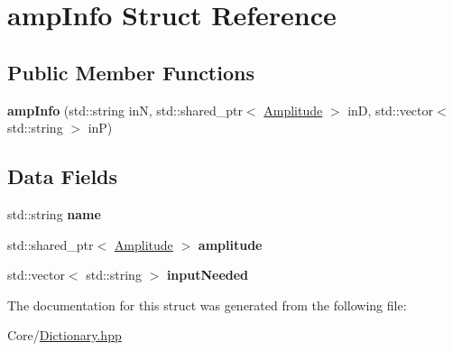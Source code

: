 \hypertarget{structamp_info}{\section{amp\-Info Struct Reference}
\label{structamp_info}
}
\subsection*{Public Member Functions}
\begin{DoxyCompactItemize}
\item 
\hypertarget{structamp_info_adf51b3bea0df687ae0efa95acf047aae}{{\bfseries amp\-Info} (std\-::string in\-N, std\-::shared\-\_\-ptr$<$ \hyperlink{class_amplitude}{Amplitude} $>$ in\-D, std\-::vector$<$ std\-::string $>$ in\-P)}\label{structamp_info_adf51b3bea0df687ae0efa95acf047aae}

\end{DoxyCompactItemize}
\subsection*{Data Fields}
\begin{DoxyCompactItemize}
\item 
\hypertarget{structamp_info_a0263db94bf652961389a1e4e508cac55}{std\-::string {\bfseries name}}\label{structamp_info_a0263db94bf652961389a1e4e508cac55}

\item 
\hypertarget{structamp_info_abf7aa0471429f084b02f6919ae9c577b}{std\-::shared\-\_\-ptr$<$ \hyperlink{class_amplitude}{Amplitude} $>$ {\bfseries amplitude}}\label{structamp_info_abf7aa0471429f084b02f6919ae9c577b}

\item 
\hypertarget{structamp_info_aa6921b9706ace35b8f7e9768a88aee14}{std\-::vector$<$ std\-::string $>$ {\bfseries input\-Needed}}\label{structamp_info_aa6921b9706ace35b8f7e9768a88aee14}

\end{DoxyCompactItemize}


The documentation for this struct was generated from the following file\-:\begin{DoxyCompactItemize}
\item 
Core/\hyperlink{_dictionary_8hpp}{Dictionary.\-hpp}\end{DoxyCompactItemize}
